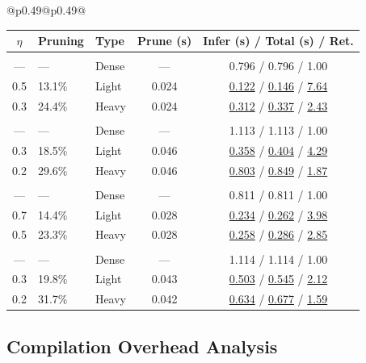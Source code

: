 \begin{table}[!htbp]
\begin{tabular}{@{}p{}@{}p{}@{}}
\begin{tabular}{c l l c c}
\toprule
\textbf{$\eta$} & \textbf{Pruning} & \textbf{Type} & \textbf{Prune (s)} & \textbf{Infer (s)} / \textbf{Total (s)} / \textbf{Ret.} \\
\midrule
\rowcolor{lightgray} \multicolumn{5}{c}{\rule{0pt}{2.2ex}\textbf{Qwen2.5-7B (ARC)}\rule[-0.8ex]{0pt}{0pt}} \\
--- & --- & Dense & --- & 0.796 / 0.796 / 1.00 \\
0.5 & 13.1\% & Light & 0.024 & \underline{0.122} / \underline{0.146} / \underline{7.64} \\
0.3 & 24.4\% & Heavy & 0.024 & \underline{0.312} / \underline{0.337} / \underline{2.43} \\
\addlinespace[0.5pt]
\rowcolor{lightgray} \multicolumn{5}{c}{\rule{0pt}{2.2ex}\textbf{Qwen2.5-14B (ARC)}\rule[-0.8ex]{0pt}{0pt}} \\
--- & --- & Dense & --- & 1.113 / 1.113 / 1.00 \\
0.3 & 18.5\% & Light & 0.046 & \underline{0.358} / \underline{0.404} / \underline{4.29} \\
0.2 & 29.6\% & Heavy & 0.046 & \underline{0.803} / \underline{0.849} / \underline{1.87} \\
\addlinespace[0.5pt]
\rowcolor{lightgray} \multicolumn{5}{c}{\rule{0pt}{2.2ex}\textbf{LLaMA-3.1-8B (ARC)}\rule[-0.8ex]{0pt}{0pt}} \\
--- & --- & Dense & --- & 0.811 / 0.811 / 1.00 \\
0.7 & 14.4\% & Light & 0.028 & \underline{0.234} / \underline{0.262} / \underline{3.98} \\
0.5 & 23.3\% & Heavy & 0.028 & \underline{0.258} / \underline{0.286} / \underline{2.85} \\
\addlinespace[0.5pt]
\rowcolor{lightgray} \multicolumn{5}{c}{\rule{0pt}{2.2ex}\textbf{LLaMA-2-13B (ARC)}\rule[-0.8ex]{0pt}{0pt}} \\
--- & --- & Dense & --- & 1.114 / 1.114 / 1.00 \\
0.3 & 19.8\% & Light & 0.043 & \underline{0.503} / \underline{0.545} / \underline{2.12} \\
0.2 & 31.7\% & Heavy & 0.042 & \underline{0.634} / \underline{0.677} / \underline{1.59} \\
\bottomrule
\end{tabular}
\end{tabular}
\label{tab:compilation_overhead}
\end{table}

\subsection{Compilation Overhead Analysis}
\label{app:efficiency_compilation}


